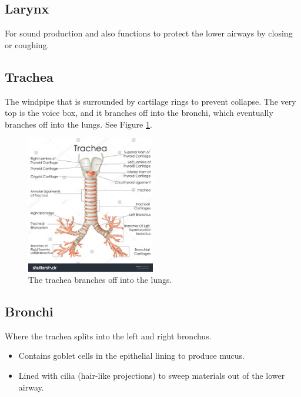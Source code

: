 \documentclass[12pt]{report}
\begin{document}
\subsection{Larynx}
\begin{definition}[Larynx]
    For sound production and also functions to protect the lower airways by closing or coughing.
\end{definition}

\subsection{Trachea}
\begin{definition}[Trachea]
    The windpipe that is surrounded by cartilage rings to prevent collapse. The very top is the voice box, and it branches off into the bronchi, which eventually branches off into the lungs. See Figure \ref{fig:trachea}.
\end{definition}

\begin{figure}[H]
\centering
    \includegraphics[width=0.5\textwidth]{../figures/trachea.jpg}
    \caption{The trachea branches off into the lungs.}
    \label{fig:trachea}
\end{figure}

\subsection{Bronchi}
\begin{definition}[Bronchi]
    Where the trachea splits into the left and right bronchus.
    \begin{itemize}
        \item{Contains goblet cells in the epithelial lining to produce mucus.}
        \item{Lined with cilia (hair-like projections) to sweep materials out of the lower airway.}
    \end{itemize}
\end{definition}
\end{document}
